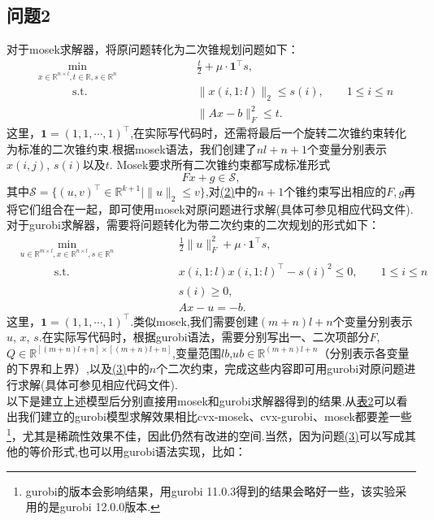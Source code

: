 \documentclass[10pt,a4paper]{article}
\begin{document}
\subsection{问题2}
\indent 对于mosek求解器，将原问题转化为二次锥规划问题如下：
\begin{equation}
	\begin{alignedat}{2}
		&\min_{x\in \mathbb{R}^{n\times l}, t\in \mathbb{R}, s\in\mathbb{R}^{n}} &\quad& \frac{t}{2}+\mu\cdot\mathbf{1}^{\top}s,\\
		&\qquad\quad\text{s.t.}\phantom{{}_{x\in \mathbb{R}^{n\times l}, t\in \mathbb{R}, s\in\mathbb{R}^{n}}} & & \|x(i,1:l)\|_{2}\leq s(i),\qquad 1\leq i\leq n\\
		&&&\|Ax-b\|_{F}^{2}\leq t.
	\end{alignedat}
	\label{3}
\end{equation}
这里，$\mathbf{1}=(1,1,\cdots,1)^{\top}$,在实际写代码时，还需将最后一个旋转二次锥约束转化为标准的二次锥约束.根据mosek语法，我们创建了$nl+n+1$个变量分别表示$x(i,j)$, $s(i)$以及$t$. Mosek要求所有二次锥约束都写成标准形式
$$Fx+g\in \mathcal{S},$$
其中$\mathcal{S}=\{(u,v)^{\top}\in\mathbb{R}^{k+1}|\|u\|_{2}\leq v\}$,对\hyperref[3]{(2)}中的$n+1$个锥约束写出相应的$F,g$再将它们组合在一起，即可使用mosek对原问题进行求解(具体可参见相应代码文件).\\
\indent 对于gurobi求解器，需要将问题转化为带二次约束的二次规划的形式如下：
\begin{equation}
	\begin{alignedat}{2}
		&\min_{u\in \mathbb{R}^{m\times l}, x\in \mathbb{R}^{n\times l}, s\in\mathbb{R}^{n}} &\quad& \frac{1}{2}\|u\|_{F}^{2}+\mu\cdot\mathbf{1}^{\top}s,\\
		&\qquad\quad\text{s.t.}\phantom{{}_{x\in \mathbb{R}^{n\times l}, t\in \mathbb{R}, s\in\mathbb{R}^{n}}} & & x(i,1:l)x(i,1:l)^{\top}-s(i)^{2}\leq 0,\qquad 1\leq i\leq n\\
		&&&s(i)\geq 0,\\
		&&&Ax-u=-b.
	\end{alignedat}
	\label{4}
\end{equation}
这里，$\mathbf{1}=(1,1,\cdots,1)^{\top}$.类似mosek,我们需要创建$(m+n)l+n$个变量分别表示$u$, $x$, $s$.在实际写代码时，根据gurobi语法，需要分别写出一、二次项部分$F$, $Q\in  \mathbb{R}^{[(m+n)l+n]\times [(m+n)l+n]}$,变量范围$lb$,$ub\in \mathbb{R}^{(m+n)l+n}$（分别表示各变量的下界和上界）,以及\hyperref[4]{(3)}中的$n$个二次约束，完成这些内容即可用gurobi对原问题进行求解(具体可参见相应代码文件).\\
\indent 以下是建立上述模型后分别直接用mosek和gurobi求解器得到的结果.从\hyperref[5]{表2}可以看出我们建立的gurobi模型求解效果相比cvx-mosek、cvx-gurobi、mosek都要差一些\footnote{gurobi的版本会影响结果，用gurobi 11.0.3得到的结果会略好一些，该实验采用的是gurobi 12.0.0版本.}，尤其是稀疏性效果不佳，因此仍然有改进的空间.当然，因为问题\hyperref[4]{(3)}可以写成其他的等价形式,也可以用gurobi语法实现，比如：
\end{document}
